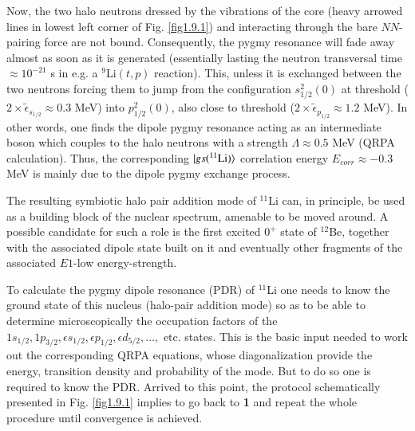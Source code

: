 Now, the two halo neutrons dressed by the vibrations of the core (heavy arrowed lines in lowest left corner of Fig. \ref{fig1.9.1}) and interacting through the bare $NN$-pairing force are not bound. Consequently, the pygmy resonance will fade away almost as soon as it is generated (essentially lasting the neutron transversal time $\approx 10^{-21}$ s in e.g. a $^9$Li$(t,p)$ reaction). This, unless it is exchanged between the two neutrons forcing them to jump from the configuration $s^{2}_{1/2}(0)$ at threshold ($2\times\tilde\epsilon_{s_{1/2}}\approx 0.3$ MeV) into  $p^2_{1/2}(0)$, also close to threshold     ($2\times\tilde\epsilon_{p_{1/2}}\approx 1.2$ MeV). In other words, one finds the dipole pygmy resonance acting as an intermediate boson which  couples to the halo neutrons with a  strength $\Lambda\approx 0.5$ MeV (QRPA calculation). Thus, the corresponding $|{gs(^{11}\text{Li})} \rangle$ correlation energy $E_{corr}\approx-0.3$ MeV is mainly due to the dipole pygmy exchange process.


 The resulting symbiotic halo pair addition mode of $^{11}$Li can, in principle, be used as a building block of the nuclear spectrum, amenable to  be moved around. A possible candidate for such a role is the first excited $0^+$ state of $^{12}$Be, together with the associated dipole state built on it and eventually other fragments of the associated $E1$-low energy-strength.


 To calculate the pygmy dipole  resonance (PDR) of $^{11}$Li one needs to know the ground state of this nucleus (halo-pair addition mode) so as to be able to determine microscopically the occupation factors of the $1s_{1/2},1p_{3/2},\epsilon s_{1/2},\epsilon p_{1/2},\epsilon d_{5/2},\dots,$ etc. states.  This is the basic input needed to work out the corresponding QRPA equations, whose diagonalization provide the energy, transition density and probability of the mode. But to do so one is required to know the PDR. Arrived to this point, the protocol schematically presented in Fig. \ref{fig1.9.1}  implies to  go back to \textbf{1} and repeat the whole procedure until   convergence is achieved. 

